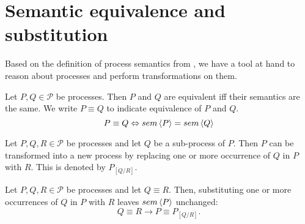 \clearpage
\section{Semantic equivalence and substitution}
\label{chp:semantic_equivalence}
Based on the definition of process semantics from , we have a tool at hand to reason about processes and perform transformations on them.

\begin{definition}
\label{def:process_equivalence}
Let $P, Q \in \mathcal{P}$ be processes. Then $P$ and $Q$ are equivalent iff their semantics are the same. We write $P \equiv Q$ to indicate equivalence of $P$ and $Q$.
  \begin{equation*}
    \label{eqn:equivalence}
    P \equiv Q \Leftrightarrow sem \left\langle P \right\rangle = sem \left\langle Q \right\rangle
  \end{equation*}
  \hfill\qedsymbol
\end{definition}


\begin{definition}
\label{def:process_substitution}
Let $P, Q, R \in \mathcal{P}$ be processes and let $Q$ be a sub-process of $P$. Then $P$ can be transformed into a new process by replacing one or more occurrence of $Q$ in $P$ with $R$. This is denoted by $P_{\left[ Q / R \right]}$.

\hfill\qedsymbol
\end{definition}



\begin{theorem}
\label{thm:process_substitution}
Let $P, Q, R \in \mathcal{P}$ be processes and let $Q \equiv R$. Then, substituting one or more occurrences of $Q$ in $P$ with $R$ leaves $sem \left\langle P \right\rangle$ unchanged:
  \begin{equation*}
    Q \equiv R \rightarrow P \equiv P_{\left[ Q / R \right]}.
  \end{equation*}
  
  \hfill\qedsymbol
\end{theorem}


